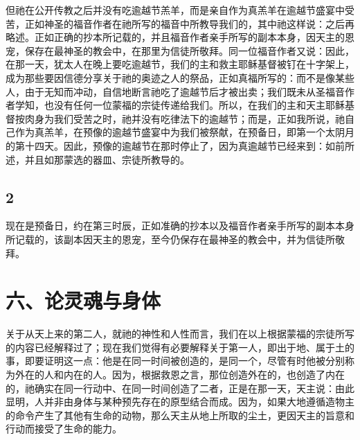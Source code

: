 但祂在公开传教之后并没有吃逾越节羔羊，而是亲自作为真羔羊在逾越节盛宴中受苦，正如神圣的福音作者在祂所写的福音中所教导我们的，其中祂这样说：之后再略述。正如正确的抄本所记载的，并且福音作者亲手所写的副本本身，因天主的恩宠，保存在最神圣的教会中，在那里为信徒所敬拜。同一位福音作者又说：因此，在那一天，犹太人在晚上要吃逾越节，我们的主和救主耶稣基督被钉在十字架上，成为那些要因信德分享关于祂的奥迹之人的祭品，正如真福所写的：而不是像某些人，由于无知而冲动，自信地断言祂吃了逾越节后才被出卖；我们既未从圣福音作者学知，也没有任何一位蒙福的宗徒传递给我们。所以，在我们的主和天主耶稣基督按肉身为我们受苦之时，祂并没有吃律法下的逾越节；而是，正如我所说，祂自己作为真羔羊，在预像的逾越节盛宴中为我们被祭献，在预备日，即第一个太阴月的第十四天。因此，预像的逾越节在那时停止了，因为真逾越节已经来到：如前所述，并且如那蒙选的器皿、宗徒所教导的。\par


\subsection{2}

现在是预备日，约在第三时辰，正如准确的抄本以及福音作者亲手所写的副本本身所记载的，该副本因天主的恩宠，至今仍保存在最神圣的教会中，并为信徒所敬拜。\par


\section{六、论灵魂与身体}

关于从天上来的第二人，就祂的神性和人性而言，我们在以上根据蒙福的宗徒所写的内容已经解释过了；现在我们觉得有必要解释关于第一人，即出于地、属于土的事，即要证明这一点：他是在同一时间被创造的，是同一个，尽管有时他被分别称为外在的人和内在的人。因为，根据救恩之言，那位创造外在的，也创造了内在的，祂确实在同一行动中、在同一时间创造了二者，正是在那一天，天主说：由此显明，人并非由身体与某种预先存在的原型结合而成。因为，如果大地遵循造物主的命令产生了其他有生命的动物，那么天主从地上所取的尘土，更因天主的旨意和行动而接受了生命的能力。\par

